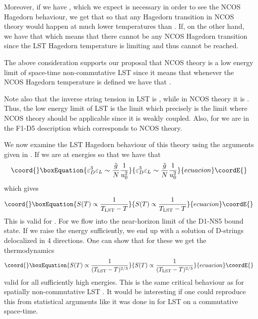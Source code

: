 \documentclass[a4paper,twoside,titlepage,12pt]{article}
\begin{document}
Moreover, if we have \coordHE{}, which we expect is 
necessary in order to see the NCOS Hagedorn behaviour, we get
that \coordHE{} so that any Hagedorn transition in NCOS theory
would happen at much lower temperatures than \myHighlight{\( \tlst \)}\coordHE{}.
If, on the other hand, \coordHE{} we have that
\coordHE{} which means that there cannot be any NCOS
Hagedorn transition since the LST Hagedorn temperature 
is limiting \cite{Harmark:2000hw,Berkooz:2000mz} and \coordHE{}
thus cannot be reached. 

The above consideration supports our proposal 
that NCOS theory is a low energy limit of space-time non-commutative LST since 
it means that whenever the NCOS Hagedorn temperature \coordHE{}
is defined we have that \coordHE{}.

Note also that the inverse string tension in LST is 
\coordHE{}, while in NCOS theory it is
\coordHE{}.
Thus, the low energy limit of LST is the limit \coordHE{}
which precisely is the limit where NCOS theory should be applicable since
it is weakly coupled. Also, for \coordHE{}
we are in the F1-D5 description which corresponds to NCOS theory.

We now examine the LST Hagedorn behaviour of this theory using the arguments
given in \cite{Harmark:2000hw}. 
If we are at energies so that \coordHE{} we have that 
%
\begin{equation}\coord{}\boxEquation{
\varepsilon_D^3 \varepsilon_L \sim \frac{\tilde{g}}{N} \frac{1}{u_0^2}
}{
\varepsilon_D^3 \varepsilon_L \sim \frac{\tilde{g}}{N} \frac{1}{u_0^2}
}{ecuacion}\coordE{}\end{equation}
%
which gives 
%
\begin{equation}\coord{}\boxEquation{
S(T) \propto \frac{1}{\tlst-T}
}{
S(T) \propto \frac{1}{\tlst-T}
}{ecuacion}\coordE{}\end{equation}
%
This is valid for \coordHE{}.
For \coordHE{} we flow into the near-horizon
limit of the D1-NS5 bound state.
If we raise the energy sufficiently, we end up with 
a solution of D-strings delocalized in 4 directions.
One can show that for these we get the thermodynamics
%
\begin{equation}\coord{}\boxEquation{
S(T) \propto \frac{1}{(\tlst - T )^{2/3}} 
}{
S(T) \propto \frac{1}{(\tlst - T )^{2/3}} 
}{ecuacion}\coordE{}\end{equation}
%
valid for all sufficiently high energies.
This is the same critical behaviour as for spatially non-commutative
LST \cite{Harmark:2000hw,Correia:2000}.
It would be interesting if one could reproduce this from 
statistical arguments 
like it was done in \cite{Harmark:2000hw,Berkooz:2000mz}
for LST on a commutative space-time.
\end{document}
